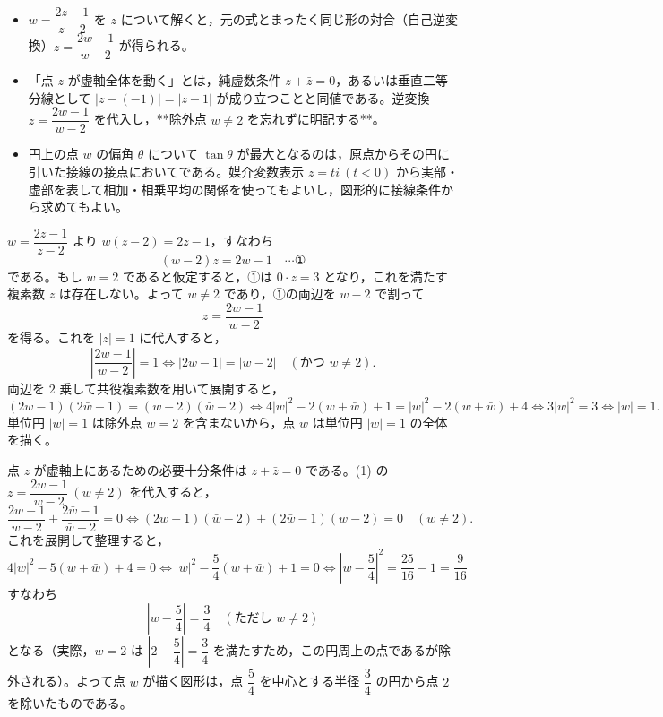 
\begin{itemize}[leftmargin=1.6em,itemsep=2pt,topsep=2pt]
  \item[(1)] $w=\dfrac{2z-1}{z-2}$ を $z$ について解くと，元の式とまったく同じ形の対合（自己逆変換）$z=\dfrac{2w-1}{w-2}$ が得られる。
  \item[(2)] 「点 $z$ が虚軸全体を動く」とは，純虚数条件 $z+\bar{z}=0$，あるいは垂直二等分線として $|z-(-1)|=|z-1|$ が成り立つことと同値である。逆変換 $z=\dfrac{2w-1}{w-2}$ を代入し，**除外点 $w\neq 2$ を忘れずに明記する**。
  \item[(4)] 円上の点 $w$ の偏角 $\theta$ について $\tan\theta$ が最大となるのは，原点からその円に引いた接線の接点においてである。媒介変数表示 $z=ti\ (t<0)$ から実部・虚部を表して相加・相乗平均の関係を使ってもよいし，図形的に接線条件から求めてもよい。
\end{itemize}

$w=\dfrac{2z-1}{z-2}$ より $w(z-2)=2z-1$，すなわち
\[
  (w-2)z = 2w-1 \quad\cdots\text{①}
\]
である。もし $w=2$ であると仮定すると，①は $0\cdot z=3$ となり，これを満たす複素数 $z$ は存在しない。よって $w\neq 2$ であり，①の両辺を $w-2$ で割って
\[
  z = \frac{2w-1}{w-2}
\]
を得る。これを $|z|=1$ に代入すると，
\[
  \left|\frac{2w-1}{w-2}\right| = 1 \iff |2w-1| = |w-2| \quad (\text{かつ }w\neq 2).
\]
両辺を $2$ 乗して共役複素数を用いて展開すると，
\[
  (2w-1)(2\bar{w}-1) = (w-2)(\bar{w}-2)
  \iff 4|w|^{2}-2(w+\bar{w})+1 = |w|^{2}-2(w+\bar{w})+4
  \iff 3|w|^{2}=3 \iff |w|=1.
\]
単位円 $|w|=1$ は除外点 $w=2$ を含まないから，点 $w$ は単位円 $|w|=1$ の全体を描く。


点 $z$ が虚軸上にあるための必要十分条件は $z+\bar{z}=0$ である。(1) の $z=\dfrac{2w-1}{w-2}\ (w\neq 2)$ を代入すると，
\[
  \frac{2w-1}{w-2} + \frac{2\bar{w}-1}{\bar{w}-2} = 0
  \iff (2w-1)(\bar{w}-2) + (2\bar{w}-1)(w-2) = 0 \quad (w\neq 2).
\]
これを展開して整理すると，
\[
  4|w|^{2} - 5(w+\bar{w}) + 4 = 0
  \iff |w|^{2} - \frac{5}{4}(w+\bar{w}) + 1 = 0
  \iff \left|w-\frac{5}{4}\right|^{2} = \frac{25}{16}-1 = \frac{9}{16}
\]
すなわち
\[
  \left|w-\frac{5}{4}\right| = \frac{3}{4} \quad (\text{ただし }w\neq 2)
\]
となる（実際，$w=2$ は $\left|2-\dfrac{5}{4}\right|=\dfrac{3}{4}$ を満たすため，この円周上の点であるが除外される）。よって点 $w$ が描く図形は，点 $\dfrac{5}{4}$ を中心とする半径 $\dfrac{3}{4}$ の円から点 $2$ を除いたものである。

